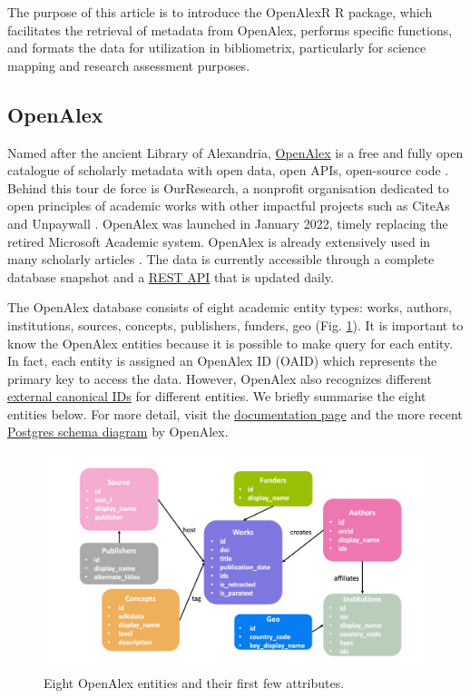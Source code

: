 The purpose of this article is to introduce the OpenAlexR R package, which facilitates the retrieval of metadata from OpenAlex, performs specific functions, and formats the data for utilization in bibliometrix, particularly for science mapping and research assessment purposes.




\subsection{OpenAlex}
Named after the ancient Library of Alexandria, \href{http://docs.openalex.org}{OpenAlex} is a free and fully open catalogue of scholarly metadata with open data, open APIs, open-source code \citep{priem2022openalex}.
Behind this tour de force is OurResearch, a nonprofit organisation dedicated to open principles of academic works with other impactful projects such as CiteAs \citep{du2021citeas} and Unpaywall \citep{chawla2017unpaywall}.
OpenAlex was launched in January 2022, timely replacing the retired Microsoft Academic system. OpenAlex is already extensively used in many scholarly articles \citep{belfiore2022characterising}. 
The data is currently accessible through a complete database snapshot and a \href{https://en.wikipedia.org/wiki/Representational_state_transfer#Applied_to_web_services}{REST API} that is updated daily.

The OpenAlex database consists of eight academic entity types: works, authors, institutions, sources, concepts, publishers, funders, geo (Fig. \ref{oa-metagraph}). It is important to know the OpenAlex entities because it is possible to make query for each entity. In fact, each entity is assigned an OpenAlex ID (OAID) which represents the primary key to access the data. 
However, OpenAlex also recognizes different \href{https://docs.openalex.org/how-to-use-the-api/get-single-entities#canonical-external-ids}{external canonical IDs} for different entities.
We briefly summarise the eight entities below.
For more detail, visit the \href{http://docs.openalex.org/}{documentation page} and the more recent \href{https://docs.openalex.org/download-all-data/upload-to-your-database/load-to-a-relational-database/postgres-schema-diagram}{Postgres schema diagram} by OpenAlex.

\begin{figure}[htbp]
  \centering
  \includegraphics[scale=0.40]{figures/oa-metagraph}
  \caption{Eight OpenAlex entities and their first few attributes.}
  \label{oa-metagraph}
\end{figure}

